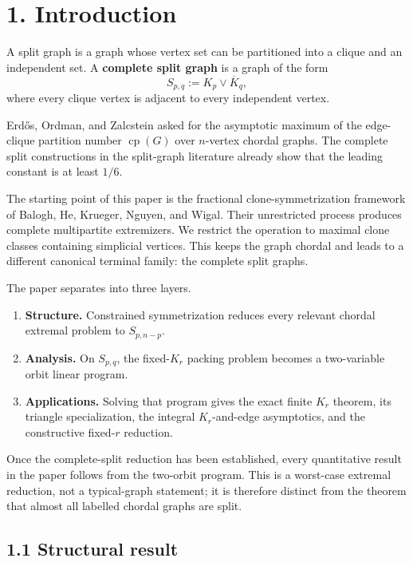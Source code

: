 \documentclass[11pt,a4paper]{article}
\providecommand{\tightlist}{\setlength{\itemsep}{0pt}\setlength{\parskip}{0pt}}
\begin{document}
\section{1. Introduction}\label{introduction}

A split graph is a graph whose vertex set can be partitioned into a clique
and an independent set. A \textbf{complete split graph} is a graph of the form
\[
S_{p,q}:=K_p\vee\overline K_q,
\tag{1.1}
\]
where every clique vertex is adjacent to every independent vertex.

Erdős, Ordman, and Zalcstein asked for the asymptotic maximum of the
edge-clique partition number \(\operatorname{cp}(G)\) over \(n\)-vertex
chordal graphs. The complete split constructions in the split-graph
literature already show that the leading constant is at least \(1/6\).

The starting point of this paper is the fractional clone-symmetrization
framework of Balogh, He, Krueger, Nguyen, and Wigal. Their unrestricted
process produces complete multipartite extremizers. We restrict the
operation to maximal clone classes containing simplicial vertices. This
keeps the graph chordal and leads to a different canonical terminal family:
the complete split graphs.

The paper separates into three layers.

\begin{enumerate}
\def\labelenumi{\arabic{enumi}.}
\tightlist
\item
  \textbf{Structure.} Constrained symmetrization reduces every relevant chordal
  extremal problem to \(S_{p,n-p}\).
\item
  \textbf{Analysis.} On \(S_{p,q}\), the fixed-\(K_r\) packing problem becomes a
  two-variable orbit linear program.
\item
  \textbf{Applications.} Solving that program gives the exact finite \(K_r\)
  theorem, its triangle specialization, the integral \(K_r\)-and-edge
  asymptotics, and the constructive fixed-\(r\) reduction.
\end{enumerate}

Once the complete-split reduction has been established, every quantitative
result in the paper follows from the two-orbit program. This is a worst-case
extremal reduction, not a typical-graph statement; it is therefore distinct
from the theorem that almost all labelled chordal graphs are split.

\subsection{1.1 Structural result}\label{structural-result}
\end{document}
